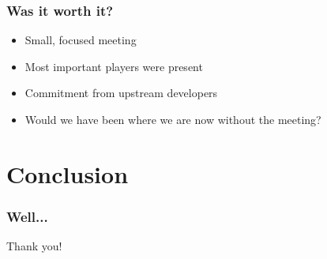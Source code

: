 \documentclass{beamer}
\begin{document}
\begin{frame}
  \frametitle{Was it worth it?}
	\begin{itemize}
	\item
		Small, focused meeting
	\item
		Most important players were present
	\item
		Commitment from upstream developers
	\item
		Would we have been where we are now without the meeting?
	\end{itemize}
\end{frame}

\section{Conclusion}

\begin{frame}
  \frametitle{Well...}
	\huge{Thank you!}
\end{frame}
\end{document}
